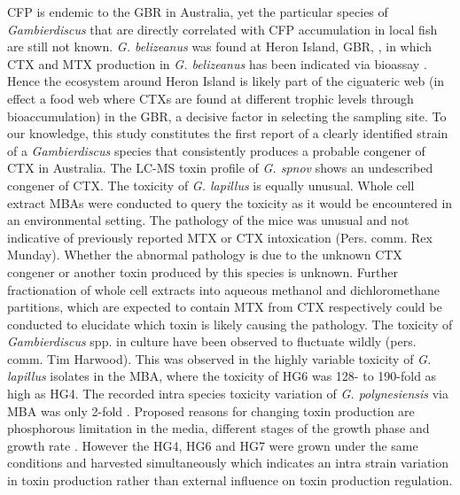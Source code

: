 \documentclass[12pt]{article}
\begin{document}
CFP is endemic to the GBR in Australia, yet the particular species of \textit{Gambierdiscus} that are directly correlated with CFP accumulation in local fish are still not known.
\emph{G. belizeanus} was found at Heron Island, GBR, \citep{murray2014molecular}, in which CTX and MTX production in \emph{G. belizeanus} has been indicated via bioassay \citep{chinain2010growth,holland2013differences}. Hence the ecosystem around Heron Island is likely part of the ciguateric web (in effect a food web where CTXs are found at different trophic levels through bioaccumulation) in the GBR, a decisive factor in selecting the sampling site.
To our knowledge, this study constitutes the first report of a clearly identified strain of a \textit{Gambierdiscus} species that consistently produces a probable congener of CTX in Australia. The LC-MS toxin profile of \emph{G. spnov} shows an undescribed congener of CTX.
The toxicity of \emph{G. lapillus} is equally unusual. Whole cell extract MBAs were conducted to query the toxicity as it would be encountered in an environmental setting. The pathology of the mice was unusual and not indicative of previously reported MTX or CTX intoxication (Pers. comm. Rex Munday). Whether the abnormal pathology is due to the unknown CTX congener or another toxin produced by this species is unknown. Further fractionation of whole cell extracts into aqueous methanol and dichloromethane partitions, which are expected to contain MTX from CTX respectively \citep{satake1993structure} could be conducted to elucidate which toxin is likely causing the pathology.
The toxicity of \emph{Gambierdiscus} spp. in culture have been observed to fluctuate wildly (pers. comm. Tim Harwood). This was observed in the highly variable toxicity of \emph{G. lapillus} isolates in the MBA, where the toxicity of HG6 was 128- to 190-fold as high as HG4.  The recorded intra species toxicity variation of \emph{G. polynesiensis} via MBA was only 2-fold \citep{chinain2010growth}. Proposed reasons for changing toxin production are phosphorous limitation in the media, different stages of the growth phase and growth rate \citep{sperr1996variation,chinain2010growth}. However the HG4, HG6 and HG7 were grown under the same conditions and harvested simultaneously which indicates an intra strain variation in toxin production rather than external influence on toxin production regulation.\\


\end{document}
